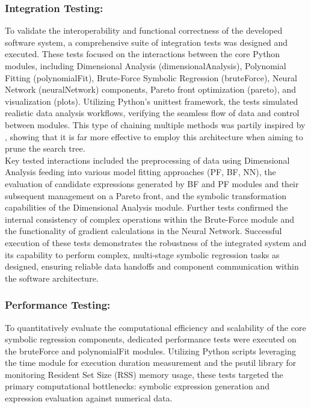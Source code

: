 \documentclass{article}
\begin{document}
\subsubsection{Integration Testing: }


To validate the interoperability and functional correctness of the developed software system, a comprehensive suite of integration tests was designed and executed. These tests focused on the interactions between the core Python modules, including Dimensional Analysis (dimensionalAnalysis), Polynomial Fitting (polynomialFit), Brute-Force Symbolic Regression (bruteForce), Neural Network (neuralNetwork) components, Pareto front optimization (pareto), and visualization (plots). Utilizing Python's unittest framework, the tests simulated realistic data analysis workflows, verifying the seamless flow of data and control between modules. This type of chaining multiple methods was partily inspired by \cite{cranmer2023}, showing that it is far more effective to employ this architecture when aiming to prune the search tree.\\

Key tested interactions included the preprocessing of data using Dimensional Analysis feeding into various model fitting approaches (PF, BF, NN), the evaluation of candidate expressions generated by BF and PF modules and their subsequent management on a Pareto front, and the symbolic transformation capabilities of the Dimensional Analysis module. Further tests confirmed the internal consistency of complex operations within the Brute-Force module and the functionality of gradient calculations in the Neural Network. Successful execution of these tests demonstrates the robustness of the integrated system and its capability to perform complex, multi-stage symbolic regression tasks as designed, ensuring reliable data handoffs and component communication within the software architecture.\\


\subsubsection{Performance Testing: }

To quantitatively evaluate the computational efficiency and scalability of the core symbolic regression components, dedicated performance tests were executed on the bruteForce and polynomialFit modules. Utilizing Python scripts leveraging the time module for execution duration measurement and the psutil library for monitoring Resident Set Size (RSS) memory usage, these tests targeted the primary computational bottlenecks: symbolic expression generation and expression evaluation against numerical data.\\
\end{document}
